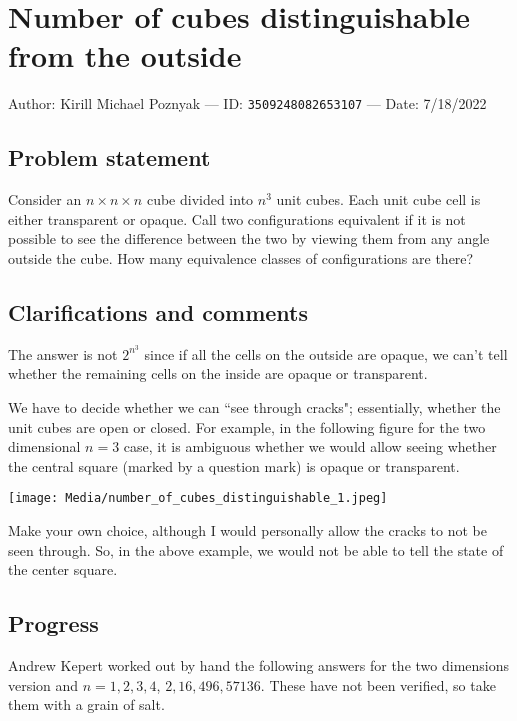 
\section{Number of cubes distinguishable from the outside}

Author: Kirill Michael Poznyak --- ID: \verb`3509248082653107` --- Date: 7/18/2022

\subsection{Problem statement}

Consider an $n\times n\times n$ cube divided into $n^3$ unit cubes. Each unit cube cell is either transparent or opaque. Call two configurations equivalent if it is not possible to see the difference between the two by viewing them from any angle outside the cube. How many equivalence classes of configurations are there?

\subsection{Clarifications and comments}

The answer is not $2^{n^3}$ since if all the cells on the outside are opaque, we can't tell whether the remaining cells on the inside are opaque or transparent.

We have to decide whether we can ``see through cracks"; essentially, whether the unit cubes are open or closed. For example, in the following figure for the two dimensional $n=3$ case, it is ambiguous whether we would allow seeing whether the central square (marked by a question mark) is opaque or transparent.

\BlankLine
\BlankLine

\texttt{[image: Media/number\_of\_cubes\_distinguishable\_1.jpeg]}

Make your own choice, although I would personally allow the cracks to not be seen through. So, in the above example, we would not be able to tell the state of the center square.

\subsection{Progress}

Andrew Kepert worked out by hand the following answers for the two dimensions version and $n=1,2,3,4$, $2,16,496,57136$. These have not been verified, so take them with a grain of salt.

